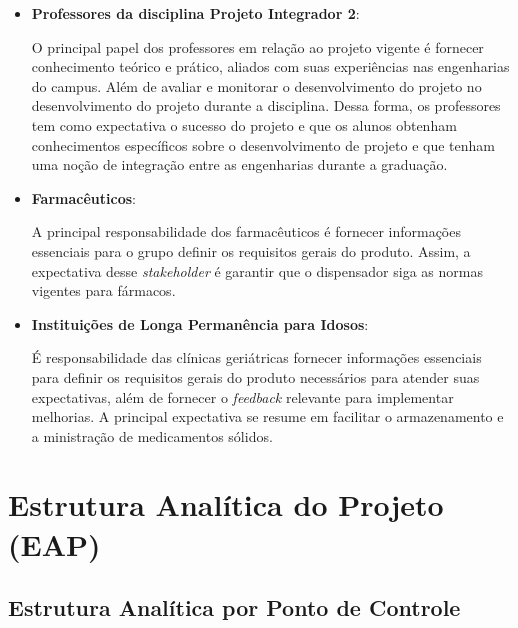 \begin{apendicesenv}
\begin{itemize}
\item \textbf{Professores da disciplina Projeto Integrador 2}:

O principal papel dos professores em relação ao projeto vigente é fornecer conhecimento teórico e prático, aliados com suas experiências nas engenharias do campus. Além de avaliar e monitorar o desenvolvimento do projeto no desenvolvimento do projeto durante a disciplina. Dessa forma, os professores tem como expectativa o sucesso do projeto e que os alunos obtenham conhecimentos específicos sobre o desenvolvimento de projeto e que tenham uma noção de integração entre as engenharias durante a graduação.
\item \textbf{Farmacêuticos}:

A principal responsabilidade dos farmacêuticos é fornecer informações essenciais para o grupo definir os requisitos gerais do produto. Assim, a expectativa desse \textit{stakeholder} é garantir que o dispensador siga as normas vigentes para fármacos.

\item \textbf{Instituições de Longa Permanência para Idosos}:

É responsabilidade das clínicas geriátricas fornecer informações essenciais para definir os requisitos gerais do produto necessários para atender suas expectativas, além de fornecer o \textit{feedback} relevante para implementar melhorias.  A principal expectativa se resume em facilitar o armazenamento e a ministração de medicamentos sólidos.
\end{itemize}



\chapter{Estrutura Analítica do Projeto (EAP)}
\label{EAP_app}
\section{Estrutura Analítica por Ponto de Controle}


\end{apendicesenv}

